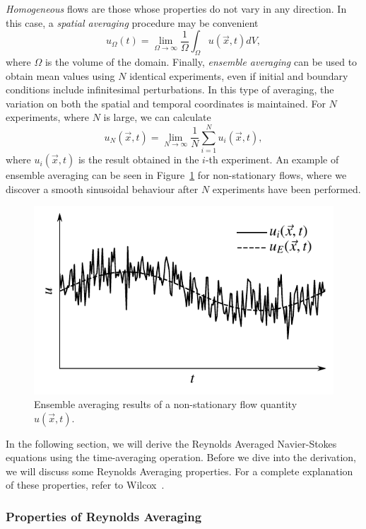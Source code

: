 \textit{Homogeneous} flows are those whose properties do not vary in any direction. In this case, a \textit{spatial averaging} procedure may be convenient
\begin{equation}
	u_\Omega(t) = \lim_{\Omega\rightarrow\infty} \frac{1}{\Omega}\int_\Omega u(\vec{x},t)dV,
\end{equation}
where $\Omega$ is the volume of the domain. Finally, \textit{ensemble averaging} can be used to obtain mean values using $N$ identical experiments, even if initial and boundary conditions include infinitesimal perturbations. In this type of averaging, the variation on both the spatial and temporal coordinates is maintained. For $N$ experiments, where $N$ is large, we can calculate
\begin{equation}
	u_N(\vec{x},t) = \lim_{N\rightarrow\infty} \frac{1}{N} \sum_{i=1}^N u_i(\vec{x},t),
\end{equation}
where $u_i({\vec{x},t})$ is the result obtained in the $i$-th experiment. An example of ensemble averaging can be seen in Figure~\ref{fig:ensemble_averaging} for non-stationary flows, where we discover a smooth sinusoidal behaviour after $N$ experiments have been performed. 

\begin{figure}[htbp]
	\centering
	\includegraphics[width=0.6\linewidth]{Pictures/ensemble_averaging}
	\caption{Ensemble averaging results of a non-stationary flow quantity $u(\vec{x},t).$}
	\label{fig:ensemble_averaging}
\end{figure}

In the following section, we will derive the Reynolds Averaged Navier-Stokes equations using the time-averaging operation. Before we dive into the derivation, we will discuss some Reynolds Averaging properties. For a complete explanation of these properties, refer to Wilcox~\cite{wilcox1998turbulence}. 

\subsubsection{Properties of Reynolds Averaging}

